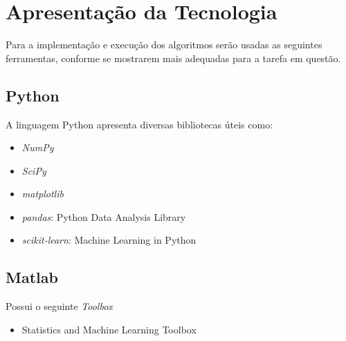 \documentclass[11pt,a4paper]{article}
\numberwithin{equation}{section}
\begin{document}
\section{Apresentação da Tecnologia}
Para a implementação e execução dos algoritmos serão usadas as seguintes ferramentas, conforme se mostrarem mais adequadas para a tarefa em questão.

\subsection{Python}
A linguagem Python apresenta diversas bibliotecas úteis como:
\begin{itemize}
\item \textit{NumPy}
\item \textit{SciPy}
\item \textit{matplotlib}
\item \textit{pandas}: Python Data Analysis Library
\item \textit{scikit-learn}: Machine Learning in Python
\end{itemize}

\subsection{Matlab}
Possui o seguinte \textit{Toolbox}
\begin{itemize}
\item Statistics and Machine Learning Toolbox
\end{itemize}
\end{document}
